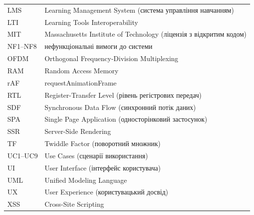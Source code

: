 \begin{tabular}{p{2.5cm}p{11.5cm}}
  LMS    & Learning Management System (система управління навчанням) \\
  LTI    & Learning Tools Interoperability \\
  MIT    & Massachusetts Institute of Technology (ліцензія з відкритим кодом) \\
  NF1--NF8 & нефункціональні вимоги до системи \\
  OFDM   & Orthogonal Frequency-Division Multiplexing \\
  RAM    & Random Access Memory \\
  rAF    & requestAnimationFrame \\
  RTL    & Register-Transfer Level (рівень регістрових передач) \\
  SDF    & Synchronous Data Flow (синхронний потік даних) \\
  SPA    & Single Page Application (односторінковий застосунок) \\
  SSR    & Server-Side Rendering \\
  TF     & Twiddle Factor (поворотний множник) \\
  UC1--UC9 & Use Cases (сценарії використання) \\
  UI     & User Interface (інтерфейс користувача) \\
  UML    & Unified Modeling Language \\
  UX     & User Experience (користувацький досвід) \\
  XSS    & Cross-Site Scripting \\
\end{tabular}
